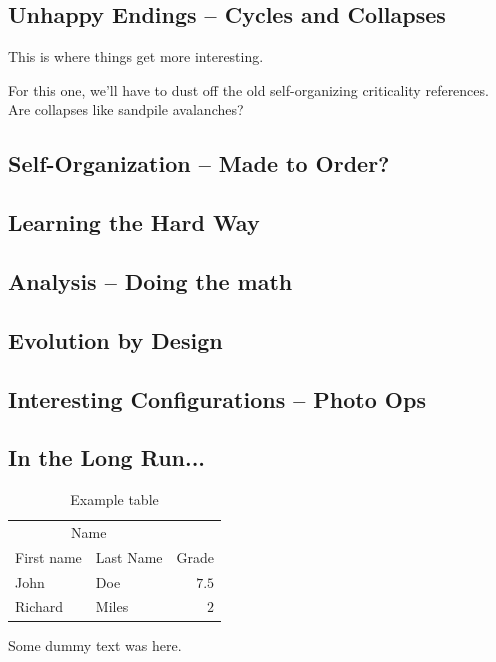 \documentclass[twoside,twocolumn]{article}
\begin{document}
\subsection{Unhappy Endings -- Cycles and Collapses}

This is where things get more interesting.

For this one, we'll have to dust off the old self-organizing criticality
references. Are collapses like sandpile avalanches?

\subsection{Self-Organization -- Made to Order?}

\subsection{Learning the Hard Way}

\subsection{Analysis -- Doing the math}

\subsection{Evolution by Design}

\subsection{Interesting Configurations -- Photo Ops}

\subsection{In the Long Run...}

\begin{table}
\caption{Example table}
\centering
\begin{tabular}{llr}
\toprule
\multicolumn{2}{c}{Name} \\
\cmidrule(r){1-2}
First name & Last Name & Grade \\
\midrule
John & Doe & $7.5$ \\
Richard & Miles & $2$ \\
\bottomrule
\end{tabular}
\end{table}

Some dummy text was here.
\end{document}
